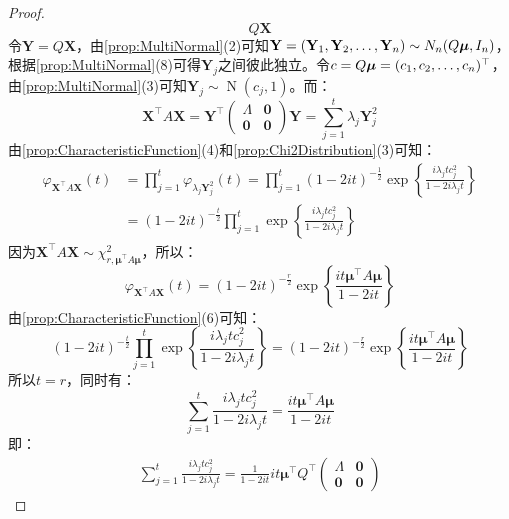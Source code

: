 \begin{proof}
\begin{equation*}
		Q\mathbf{X}
	\end{equation*}
	令$\mathbf{Y}=Q\mathbf{X}$，由\cref{prop:MultiNormal}(2)可知$\mathbf{Y}=(\mathbf{Y}_1, \mathbf{Y}_2, \dots, \mathbf{Y}_{n})\sim N_n(Q\boldsymbol{\mu},I_n)$，根据\cref{prop:MultiNormal}(8)可得$\mathbf{Y}_j$之间彼此独立。令$c=Q\boldsymbol{\mu}=(c_1, c_2, \dots, c_{n})^{\top}$，由\cref{prop:MultiNormal}(3)可知$\mathbf{Y}_j\sim \operatorname{N}(c_j,1)$。而：
	\begin{equation*}
		\mathbf{X}^{\top}A\mathbf{X}=\mathbf{Y}^{\top}
		\begin{pmatrix}
			\varLambda & \mathbf{0} \\
			\mathbf{0} & \mathbf{0}
		\end{pmatrix}\mathbf{Y}=\sum_{j=1}^{t}\lambda_j\mathbf{Y}_j^2
	\end{equation*}
	由\cref{prop:CharacteristicFunction}(4)和\cref{prop:Chi2Distribution}(3)可知：
	\begin{align*}
		\varphi_{\mathbf{X}^{\top}A\mathbf{X}}(t)
		&=\prod_{j=1}^{t}\varphi_{\lambda_j\mathbf{Y}_j^2}(t)=\prod_{j=1}^t(1-2it)^{-\frac{1}{2}}\exp\left\{\frac{i\lambda_jtc_j^2}{1-2i\lambda_jt}\right\} \\
		&=(1-2it)^{-\frac{t}{2}}\prod_{j=1}^t\exp\left\{\frac{i\lambda_jtc_j^2}{1-2i\lambda_jt}\right\}
	\end{align*}
	因为$\mathbf{X}^{\top}A\mathbf{X}\sim\chi_{r,\boldsymbol{\mu}^{\top}A\boldsymbol{\mu}}^2$，所以：
	\begin{equation*}
		\varphi_{\mathbf{X}^{\top}A\mathbf{X}}(t)=(1-2it)^{-\frac{r}{2}}\exp\left\{\frac{it\boldsymbol{\mu}^{\top}A\boldsymbol{\mu}}{1-2it}\right\}
	\end{equation*}
	由\cref{prop:CharacteristicFunction}(6)可知：
	\begin{equation*}
		(1-2it)^{-\frac{t}{2}}\prod_{j=1}^t\exp\left\{\frac{i\lambda_jtc_j^2}{1-2i\lambda_jt}\right\}=(1-2it)^{-\frac{r}{2}}\exp\left\{\frac{it\boldsymbol{\mu}^{\top}A\boldsymbol{\mu}}{1-2it}\right\}
	\end{equation*}
	所以$t=r$，同时有：
	\begin{equation*}
		\sum_{j=1}^{t}\frac{i\lambda_jtc_j^2}{1-2i\lambda_jt}=\frac{it\boldsymbol{\mu}^{\top}A\boldsymbol{\mu}}{1-2it}
	\end{equation*}
	即：
	\begin{gather*}
		\sum_{j=1}^{t}\frac{i\lambda_jtc_j^2}{1-2i\lambda_jt}=\frac{1}{1-2it}it\boldsymbol{\mu}^{\top}Q^{\top}
		\begin{pmatrix}
			\varLambda & \mathbf{0} \\
			\mathbf{0} & \mathbf{0}

\end{pmatrix}
\end{gather*}
\end{proof}
